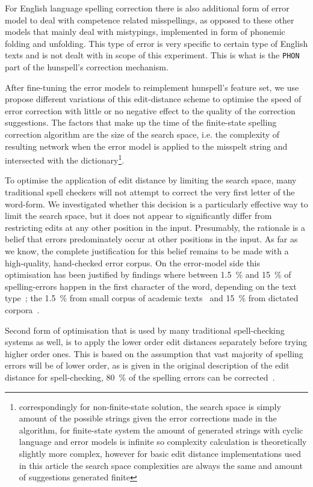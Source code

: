 \documentclass[11pt]{article}
\begin{document}
For English language spelling correction there is also additional form of
error model to deal with competence related misspellings, as opposed to these
other models that mainly deal with mistypings, implemented in form of phonemic
folding and unfolding. This type of error is very specific to certain type of
English texts and is not dealt with in scope of this experiment. This is what is
the \texttt{PHON} part of the hunspell's correction mechanism.

After fine-tuning the error models to reimplement hunspell's feature set, we
use propose different variations of this edit-distance scheme to optimise the
speed of error correction with little or no negative effect to the quality of
the correction suggestions. The factors that make up the time of the
finite-state spelling correction algorithm are the size of the search space,
i.e. the complexity of resulting network when the error model is applied to the
misspelt string and intersected with the dictionary\footnote{correspondingly
for non-finite-state solution, the search space is simply amount of the
possible strings given the error corrections made in the algorithm, for
finite-state system the amount of generated strings with cyclic language and
error models is infinite so complexity calculation is theoretically slightly
more complex, however for basic edit distance implementations used in this
article the search space complexities are always the same and amount of
suggestions generated finite}.

To optimise the application of edit distance by limiting the search space, many
traditional spell checkers will not attempt to correct the very first letter of
the word-form. We investigated whether this decision is a particularly
effective way to limit the search space, but it does not appear to
significantly differ from restricting edits at any other position in the input.
Presumably, the rationale is a belief that errors predominately occur at other
positions in the input. As far as we know, the complete justification for this
belief remains to be made with a high-quality, hand-checked error corpus.
On the error-model side this optimisation has been justified by findings where
between 1.5~\% and 15~\% of spelling-errors happen in the first character of
the word, depending on the text type~\cite{Bhagat/2007};
the 1.5~\% from small corpus of academic texts~\cite{Yannakoudakis/1983}
and 15~\% from dictated corpora~\cite{Kukich/1992}.

Second form of optimisation that is used by many traditional spell-checking
systems as well, is to apply the lower order edit distances separately before
trying higher order ones. This is based on the assumption that vast majority
of spelling errors will be of lower order, as is given in the original
description of the edit distance for spell-checking, 80~\% of the spelling
errors can be corrected~\cite{Pollock/1984}.
\end{document}
